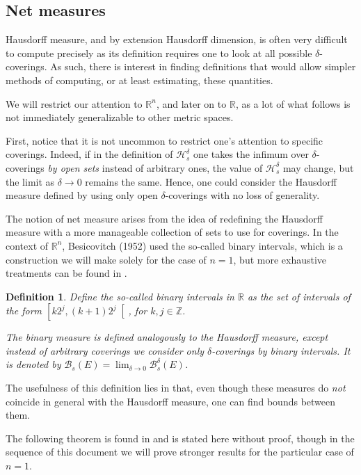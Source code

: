 \documentclass[11pt, reqno]{amsart}
\newcommand{\R}{\mathbb{R}}
\newcommand{\Z}{\mathbb{Z}}
\newcommand{\HH}{\mathcal{H}}
\newcommand{\BB}{\mathcal{B}}
\newtheorem{definition}{Definition}
\begin{document}
\subsection{Net measures}

Hausdorff measure, and by extension Hausdorff dimension, is often very difficult to compute precisely as its definition requires one to look at all possible $\delta$-coverings. As such, there is interest in finding definitions that would allow simpler methods of computing, or at least estimating, these quantities.   

We will restrict our attention to $\R^n$, and later on to $\R$, as a lot of what follows is not immediately generalizable to other metric spaces.

First, notice that it is not uncommon to restrict one's attention to specific coverings. Indeed, if in the definition of $\HH_s^\delta$ one takes the infimum over $\delta$-coverings \emph{by open sets} instead of arbitrary ones, the value of $\HH_s^\delta$ may change, but the limit as $\delta \to 0$ remains the same. Hence, one could consider the Hausdorff measure defined by using only open $\delta$-coverings with no loss of generality.

The notion of net measure arises from the idea of redefining the Hausdorff measure with a more manageable collection of sets to use for coverings. In the context of $\R^n$, Besicovitch (1952) used the so-called binary intervals, which is a construction we will make solely for the case of $n = 1$, but more exhaustive treatments can be found in \cite{falconer, rogers}.

\begin{definition}
Define the so-called \emph{binary intervals} in $\R$ as the set of intervals of the form $\left[ k 2^j, (k+1) 2^j \right[$, for $k, j \in \Z$.

The binary measure is defined analogously to the Hausdorff measure, except instead of arbitrary coverings we consider only $\delta$-coverings by binary intervals. It is denoted by $\BB_s(E) = \lim_{\delta \to 0} \BB_s^\delta(E)$.
\end{definition}

The usefulness of this definition lies in that, even though these measures do \emph{not} coincide in general with the Hausdorff measure, one can find bounds between them.

The following theorem is found in \cite{falconer, rogers} and is stated here without proof, though in the sequence of this document we will prove stronger results for the particular case of $n = 1$.
\end{document}

